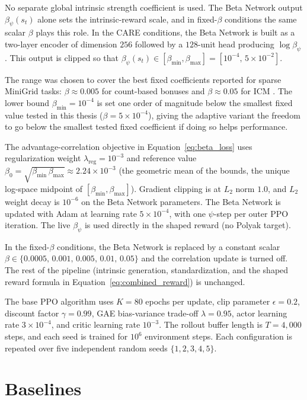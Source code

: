 No separate global intrinsic strength coefficient is used. The Beta Network output $\beta_\psi(s_t)$ alone sets the intrinsic-reward scale, and in fixed-$\beta$ conditions the same scalar $\beta$ plays this role. In the CARE conditions, the Beta Network is built as a two-layer encoder of dimension $256$ followed by a $128$-unit head producing $\log \beta_\psi$. This output is clipped so that $\beta_\psi(s_t) \in [\beta_\text{min}, \beta_\text{max}] = [10^{-4},\, 5\times 10^{-2}]$.

The range was chosen to cover the best fixed coefficients reported for sparse MiniGrid tasks: $\beta \approx 0.005$ for count-based bonuses and $\beta \approx 0.05$ for ICM \cite{andres2025impact}. The lower bound $\beta_\text{min} = 10^{-4}$ is set one order of magnitude below the smallest fixed value tested in this thesis ($\beta = 5 \times 10^{-4}$), giving the adaptive variant the freedom to go below the smallest tested fixed coefficient if doing so helps performance.

The advantage-correlation objective in Equation~\eqref{eq:beta_loss} uses regularization weight $\lambda_\text{reg} = 10^{-3}$ and reference value $\beta_0 = \sqrt{\beta_\text{min}\,\beta_\text{max}} \approx 2.24 \times 10^{-3}$ (the geometric mean of the bounds, the unique log-space midpoint of $[\beta_\text{min}, \beta_\text{max}]$). Gradient clipping is at $L_2$ norm $1.0$, and $L_2$ weight decay is $10^{-6}$ on the Beta Network parameters. The Beta Network is updated with Adam at learning rate $5 \times 10^{-4}$, with one $\psi$-step per outer PPO iteration. The live $\beta_\psi$ is used directly in the shaped reward (no Polyak target).

In the fixed-$\beta$ conditions, the Beta Network is replaced by a constant scalar $\beta \in \{0.0005,\, 0.001,\, 0.005,\, 0.01,\, 0.05\}$ and the correlation update is turned off. The rest of the pipeline (intrinsic generation, standardization, and the shaped reward formula in Equation~\eqref{eq:combined_reward}) is unchanged.

The base PPO algorithm uses $K = 80$ epochs per update, clip parameter $\epsilon = 0.2$, discount factor $\gamma = 0.99$, GAE bias-variance trade-off $\lambda = 0.95$, actor learning rate $3 \times 10^{-4}$, and critic learning rate $10^{-3}$. The rollout buffer length is $T = 4{,}000$ steps, and each seed is trained for $10^6$ environment steps. Each configuration is repeated over five independent random seeds $\{1, 2, 3, 4, 5\}$.

\section{Baselines}
\label{sec:baselines}


